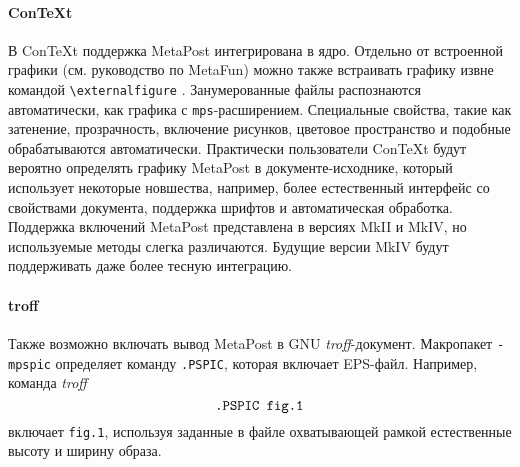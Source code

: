 \documentclass{article} %
\def\ttt{\texttt}  %
\begin{document}
\paragraph{Con\TeX t}
В Con\TeX t поддержка MetaPost интегрирована в 
ядро. 
Отдельно от встроенной графики (см. руководство по MetaFun) 
можно также встраивать графику извне командой
\verb+\externalfigure+%
.
Занумерованные файлы распознаются автоматически, как графика с 
\ttt{mps}-расширением. 
Специальные свойства, такие как затенение, прозрачность, включение рисунков, 
цветовое пространство и подобные обрабатываются автоматически.
Практически пользователи Con\TeX t будут вероятно определять графику 
MetaPost в документе-исходнике, который использует некоторые новшества, 
например, более естественный интерфейс со свойствами документа, поддержка 
шрифтов и автоматическая обработка.
Поддержка включений MetaPost представлена в версиях MkII и MkIV, но 
используемые методы слегка различаются.
Будущие версии MkIV будут поддерживать даже более тесную интеграцию.

\paragraph{troff}
Также возможно включать вывод MetaPost в GNU 
\emph{troff}-документ. 
Макропакет \ttt{-mpspic} определяет команду  \verb|.PSPIC|, которая включает EPS-файл. 
Например, команда \emph{troff}
$$ \hbox{\verb|.PSPIC fig.1|} $$
включает \ttt{fig.1}, используя заданные в файле охватывающей рамкой естественные высоту и ширину образа. 
\end{document}
